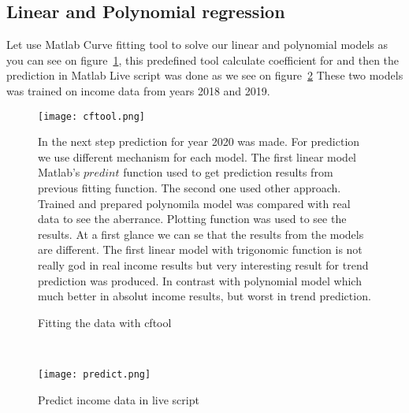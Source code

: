 \subsection{Linear and Polynomial regression} \label{sec:baseline}
Let use Matlab Curve fitting tool to solve our linear and polynomial models as you can see on figure~\ref{cftool}, this predefined tool calculate coefficient for and then
the prediction in Matlab Live script was done as we see on figure~\ref{predict}
These two models was trained on income data from years 2018 and 2019.
\begin{figure}[h!]
    \begin{center}
        \texttt{[image: cftool.png]}
    \end{center}
    \caption{Fitting the data with cftool~\cite{luarn}}
    \label{cftool}
In the next step prediction for year 2020 was made. For prediction we use different mechanism for each model.
The first linear model Matlab's $predint$ function used to get prediction results from previous fitting function.
The second one used other approach.
Trained and prepared polynomila model was compared with real data to see the aberrance. Plotting function was used to see the results.
At a first glance we can se that the results from the models are different. The first linear model with trigonomic function
is not really god in real income results but very interesting result for trend prediction was produced.
In contrast with polynomial model which much better in absolut income results, but worst in trend prediction.
\end{figure}\\
\begin{figure}[h!]
    \begin{center}
        \texttt{[image: predict.png]}
    \end{center}
    \caption{Predict income data in live script~\cite{luarn}}
    \label{predict}
\end{figure}\\
